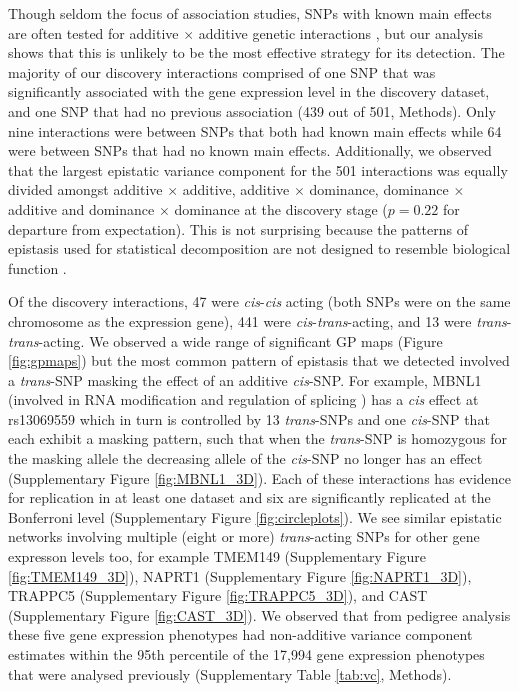\documentclass{article}
\begin{document}
Though seldom the focus of association studies, SNPs with known main effects are often tested for additive $\times$ additive genetic interactions \cite{Cordell2009}, but our analysis shows that this is unlikely to be the most effective strategy for its detection. The majority of our discovery interactions comprised of one SNP that was significantly associated with the gene expression level in the discovery dataset, and one SNP that had no previous association \cite{Powell2013} (439 out of 501, Methods). Only nine interactions were between SNPs that both had known main effects while 64 were between SNPs that had no known main effects. Additionally, we observed that the largest epistatic variance component for the 501 interactions was equally divided amongst additive $\times$ additive, additive $\times$ dominance, dominance $\times$ additive and dominance $\times$ dominance at the discovery stage ($p = 0.22$ for departure from expectation). This is not surprising because the patterns of epistasis used for statistical decomposition are not designed to resemble biological function \cite{Cockerham1954}.

Of the discovery interactions, 47 were \emph{cis}-\emph{cis} acting (both SNPs were on the same chromosome as the expression gene), 441 were \emph{cis}-\emph{trans}-acting, and 13 were \emph{trans}-\emph{trans}-acting. We observed a wide range of significant GP maps (Figure \ref{fig:gpmaps}) but the most common pattern of epistasis that we detected involved a \emph{trans}-SNP masking the effect of an additive \emph{cis}-SNP. For example, MBNL1 (involved in RNA modification and regulation of splicing \cite{Ho2004}) has a \emph{cis} effect at rs13069559 which in turn is controlled by 13 \emph{trans}-SNPs and one \emph{cis}-SNP that each exhibit a masking pattern, such that when the \emph{trans}-SNP is homozygous for the masking allele the decreasing allele of the \emph{cis}-SNP no longer has an effect (Supplementary Figure \ref{fig:MBNL1_3D}). Each of these interactions has evidence for replication in at least one dataset and six are significantly replicated at the Bonferroni level (Supplementary Figure \ref{fig:circleplots}). We see similar epistatic networks involving multiple (eight or more) \emph{trans}-acting SNPs for other gene expresson levels too, for example TMEM149 (Supplementary Figure \ref{fig:TMEM149_3D}), NAPRT1 (Supplementary Figure \ref{fig:NAPRT1_3D}), TRAPPC5 (Supplementary Figure \ref{fig:TRAPPC5_3D}), and CAST (Supplementary Figure \ref{fig:CAST_3D}). We observed that from pedigree analysis these five gene expression phenotypes had non-additive variance component estimates within the 95th percentile of the 17,994 gene expression phenotypes that were analysed previously \cite{Powell2013} (Supplementary Table \ref{tab:vc}, Methods).
\end{document}
